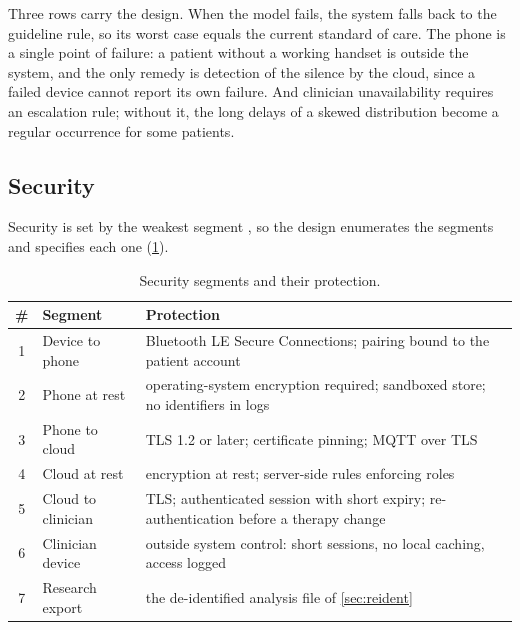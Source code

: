 Three rows carry the design. When the model fails, the system falls back to the guideline rule, so its worst case equals the current standard of care. The phone is a single point of failure: a patient without a working handset is outside the system, and the only remedy is detection of the silence by the cloud, since a failed device cannot report its own failure. And clinician unavailability requires an escalation rule; without it, the long delays of a skewed distribution become a regular occurrence for some patients.

\subsection{Security}\label{sec:security-design}\label{sec:security}\label{sec:security-gap}

Security is set by the weakest segment \parencite{mucchi2021}, so the design enumerates the segments and specifies each one (\cref{tab:security-segments}).

\begin{table}[htbp]
\centering\footnotesize
\caption{Security segments and their protection.}\label{tab:security-segments}
\begin{tabularx}{\textwidth}{@{}c >{\raggedright\arraybackslash}p{2.8cm} X@{}}
\toprule
\textbf{\#} & \textbf{Segment} & \textbf{Protection} \\
\midrule
1 & Device to phone & Bluetooth LE Secure Connections; pairing bound to the patient account \\
2 & Phone at rest & operating-system encryption required; sandboxed store; no identifiers in logs \\
3 & Phone to cloud & TLS 1.2 or later; certificate pinning; MQTT over TLS \\
4 & Cloud at rest & encryption at rest; server-side rules enforcing roles \\
5 & Cloud to clinician & TLS; authenticated session with short expiry; re-authentication before a therapy change \\
6 & Clinician device & outside system control: short sessions, no local caching, access logged \\
7 & Research export & the de-identified analysis file of \cref{sec:reident} \\
\bottomrule
\end{tabularx}
\end{table}

